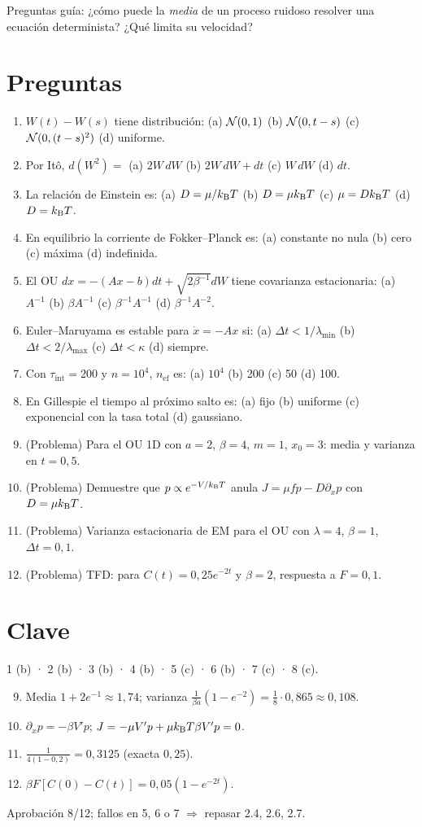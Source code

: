 \documentclass[11pt,a4paper]{article}
\begin{document}
\noindent Preguntas guía: ¿cómo puede la \emph{media} de un proceso ruidoso resolver una ecuación determinista? ¿Qué limita su velocidad?
\section*{Preguntas}
\begin{enumerate}
\item $W(t)-W(s)$ tiene distribución: (a) $\mathcal{N}(0,1)$ (b) $\mathcal{N}(0,t-s)$ (c) $\mathcal{N}(0,(t-s)^2)$ (d) uniforme.
\item Por Itô, $d(W^2)=$ (a) $2W\,dW$ (b) $2W\,dW+dt$ (c) $W\,dW$ (d) $dt$.
\item La relación de Einstein es: (a) $D=\mu/k_{\mathrm B} T$ (b) $D=\mu k_{\mathrm B} T$ (c) $\mu=Dk_{\mathrm B} T$ (d) $D=k_{\mathrm B} T$.
\item En equilibrio la corriente de Fokker--Planck es: (a) constante no nula (b) cero (c) máxima (d) indefinida.
\item El OU $dx=-(Ax-b)dt+\sqrt{2\beta^{-1}}dW$ tiene covarianza estacionaria: (a) $A^{-1}$ (b) $\beta A^{-1}$ (c) $\beta^{-1}A^{-1}$ (d) $\beta^{-1}A^{-2}$.
\item Euler--Maruyama es estable para $\dot x=-Ax$ si: (a) $\Delta t<1/\lambda_{\min}$ (b) $\Delta t<2/\lambda_{\max}$ (c) $\Delta t<\kappa$ (d) siempre.
\item Con $\tau_{\text{int}}=200$ y $n=10^4$, $n_{\text{ef}}$ es: (a) $10^4$ (b) 200 (c) 50 (d) 100.
\item En Gillespie el tiempo al próximo salto es: (a) fijo (b) uniforme (c) exponencial con la tasa total (d) gaussiano.
\item (Problema) Para el OU 1D con $a=2$, $\beta=4$, $m=1$, $x_0=3$: media y varianza en $t=0{,}5$.
\item (Problema) Demuestre que $p\propto e^{-V/k_{\mathrm B} T}$ anula $J=\mu fp-D\partial_xp$ con $D=\mu k_{\mathrm B} T$.
\item (Problema) Varianza estacionaria de EM para el OU con $\lambda=4$, $\beta=1$, $\Delta t=0{,}1$.
\item (Problema) TFD: para $C(t)=0{,}25e^{-2t}$ y $\beta=2$, respuesta a $F=0{,}1$.
\end{enumerate}
\newpage
\section*{Clave}
1 (b) · 2 (b) · 3 (b) · 4 (b) · 5 (c) · 6 (b) · 7 (c) · 8 (c).
\begin{enumerate}\setcounter{enumi}{8}
\item Media $1+2e^{-1}\approx1{,}74$; varianza $\frac1{\beta a}(1-e^{-2})=\frac18\cdot0{,}865\approx0{,}108$.
\item $\partial_xp=-\beta V'p$; $J=-\mu V'p+\mu k_{\mathrm B} T\beta V'p=0$.
\item $\frac{1}{4(1-0{,}2)}=0{,}3125$ (exacta $0{,}25$).
\item $\beta F[C(0)-C(t)]=0{,}05(1-e^{-2t})$.
\end{enumerate}
Aprobación 8/12; fallos en 5, 6 o 7 $\Rightarrow$ repasar 2.4, 2.6, 2.7.
\end{document}
